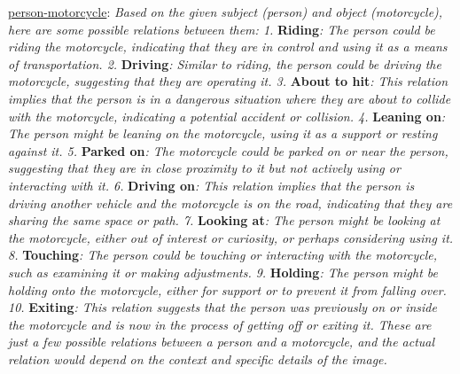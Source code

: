 \underline{person-motorcycle}: \textit{Based on the given subject (person) and object (motorcycle), here are some possible relations between them: 1.} \textbf{Riding}\textit{: The person could be riding the motorcycle, indicating that they are in control and using it as a means of transportation. 2.} \textbf{Driving}\textit{: Similar to riding, the person could be driving the motorcycle, suggesting that they are operating it. 3.} \textbf{About to hit}\textit{: This relation implies that the person is in a dangerous situation where they are about to collide with the motorcycle, indicating a potential accident or collision. 4.} \textbf{Leaning on}\textit{: The person might be leaning on the motorcycle, using it as a support or resting against it. 5.} \textbf{Parked on}\textit{: The motorcycle could be parked on or near the person, suggesting that they are in close proximity to it but not actively using or interacting with it. 6.} \textbf{Driving on}\textit{: This relation implies that the person is driving another vehicle and the motorcycle is on the road, indicating that they are sharing the same space or path. 7.} \textbf{Looking at}\textit{: The person might be looking at the motorcycle, either out of interest or curiosity, or perhaps considering using it. 8.} \textbf{Touching}\textit{: The person could be touching or interacting with the motorcycle, such as examining it or making adjustments. 9.} \textbf{Holding}\textit{: The person might be holding onto the motorcycle, either for support or to prevent it from falling over. 10.} \textbf{Exiting}\textit{: This relation suggests that the person was previously on or inside the motorcycle and is now in the process of getting off or exiting it. These are just a few possible relations between a person and a motorcycle, and the actual relation would depend on the context and specific details of the image.}


